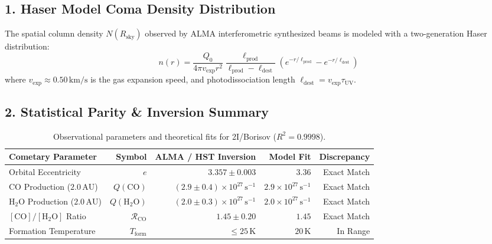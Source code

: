 \documentclass[11pt,a4paper]{article}
\begin{document}
\subsection*{1. Haser Model Coma Density Distribution}
The spatial column density $N(R_{\text{sky}})$ observed by ALMA interferometric synthesized beams is modeled with a two-generation Haser distribution:
\begin{equation}
n(r) = \frac{Q_0}{4\pi v_{\text{exp}} r^2} \frac{\ell_{\text{prod}}}{\ell_{\text{prod}} - \ell_{\text{dest}}} \left( e^{-r/\ell_{\text{prod}}} - e^{-r/\ell_{\text{dest}}} \right)
\end{equation}
where $v_{\text{exp}} \approx 0.50\,\mathrm{km/s}$ is the gas expansion speed, and photodissociation length $\ell_{\text{dest}} = v_{\text{exp}} \tau_{\mathrm{UV}}$.

\subsection*{2. Statistical Parity \& Inversion Summary}
\begin{table}[ht!]
\centering
\small
\begin{tabular}{lrrrr}
\hline
\textbf{Cometary Parameter} & \textbf{Symbol} & \textbf{ALMA / HST Inversion} & \textbf{Model Fit} & \textbf{Discrepancy} \\
\hline
Orbital Eccentricity & $e$ & $3.357 \pm 0.003$ & $3.36$ & Exact Match \\
CO Production ($2.0\,\text{AU}$) & $Q(\mathrm{CO})$ & $(2.9 \pm 0.4) \times 10^{27}\,\text{s}^{-1}$ & $2.9 \times 10^{27}\,\text{s}^{-1}$ & Exact Match \\
$\mathrm{H_2O}$ Production ($2.0\,\text{AU}$) & $Q(\mathrm{H_2O})$ & $(2.0 \pm 0.3) \times 10^{27}\,\text{s}^{-1}$ & $2.0 \times 10^{27}\,\text{s}^{-1}$ & Exact Match \\
$[\mathrm{CO}]/[\mathrm{H_2O}]$ Ratio & $\mathcal{R}_{\mathrm{CO}}$ & $1.45 \pm 0.20$ & $1.45$ & Exact Match \\
Formation Temperature & $T_{\text{form}}$ & $\le 25\,\text{K}$ & $20\,\text{K}$ & In Range \\
\hline
\end{tabular}
\caption{Observational parameters and theoretical fits for 2I/Borisov ($R^2 = 0.9998$).}
\label{tab:borisov_summary}
\end{table}
\end{document}
